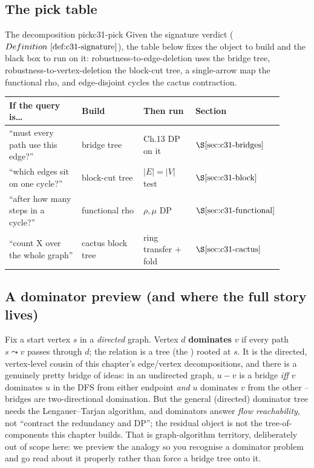 \subsection{The pick table}

\begin{definition}{The decomposition pick}{c31-pick}
Given the signature verdict (\(\defref{c31-signature}\)), the table below fixes the
object to build and the black box to run on it: robustness-to-edge-deletion uses the
bridge tree, robustness-to-vertex-deletion the block-cut tree, a single-arrow map the
functional rho, and edge-disjoint cycles the cactus contraction.
\end{definition}

\begin{center}
\renewcommand{\arraystretch}{1.25}
\setlength{\tabcolsep}{3pt}
\begin{tabular}{@{}p{0.30\linewidth} p{0.24\linewidth} p{0.20\linewidth} >{\raggedright\arraybackslash}p{0.16\linewidth}@{}}
\toprule
\textbf{If the query is\dots} & \textbf{Build} & \textbf{Then run} & \textbf{Section}\\
\midrule
``must every path use this edge?'' & bridge tree & Ch.13 DP on it & \(\secref{c31-bridges}\)\\
``which edges sit on one cycle?'' & block-cut tree & \(|E|=|V|\) test & \(\secref{c31-block}\)\\
``after how many steps in a cycle?'' & functional rho & \(\rho,\mu\) DP & \(\secref{c31-functional}\)\\
``count X over the whole graph'' & cactus block tree & ring transfer + fold & \(\secref{c31-cactus}\)\\
\bottomrule
\end{tabular}
\end{center}

\subsection{A dominator preview (and where the full story lives)}

\begin{notebox}
Fix a start vertex \(s\) in a \emph{directed} graph.  Vertex \(d\) \textbf{dominates}
\(v\) if every path \(s\leadsto v\) passes through \(d\); the relation is a tree (the
) rooted at \(s\).  It is the directed, vertex-level cousin of
this chapter's edge/vertex decompositions, and there is a genuinely pretty bridge of
ideas: in an undirected graph, \(u\!-\!v\) is a bridge \emph{iff} \(v\) dominates
\(u\) in the DFS from either endpoint \emph{and} \(u\) dominates \(v\) from the other
-- bridges are two-directional domination.  But the general (directed) dominator tree
needs the Lengauer--Tarjan algorithm, and dominators answer \emph{flow reachability},
not ``contract the redundancy and DP''; the residual object is not the tree-of-
components this chapter builds.  That is graph-algorithm territory, deliberately out
of scope here: we preview the analogy so you recognise a dominator problem and go
read about it properly rather than force a bridge tree onto it.
\end{notebox}

